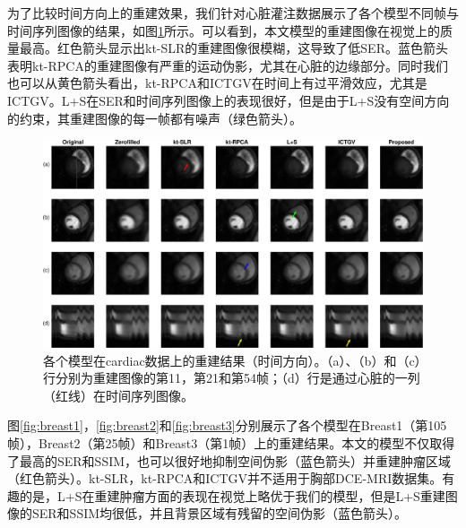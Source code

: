 为了比较时间方向上的重建效果，我们针对心脏灌注数据展示了各个模型不同帧与时间序列图像的结果，如图\ref{fig:perfusion_frames}所示。可以看到，本文模型的重建图像在视觉上的质量最高。红色箭头显示出kt-SLR的重建图像很模糊，这导致了低SER。蓝色箭头表明kt-RPCA的重建图像有严重的运动伪影，尤其在心脏的边缘部分。同时我们也可以从黄色箭头看出，kt-RPCA和ICTGV在时间上有过平滑效应，尤其是ICTGV。L+S在SER和时间序列图像上的表现很好，但是由于L+S没有空间方向的约束，其重建图像的每一帧都有噪声（绿色箭头）。
\begin{figure}
\centering
\includegraphics[width=1\textwidth]{img/tgvnn/figure4_perfusion_frames.eps}
\caption{各个模型在cardiac数据上的重建结果（时间方向）。（a）、（b）和（c）行分别为重建图像的第11，第21和第54帧；（d）行是通过心脏的一列（红线）在时间序列图像。}
\label{fig:perfusion_frames}
\end{figure}

图\ref{fig:breast1}，\ref{fig:breast2}和\ref{fig:breast3}分别展示了各个模型在Breast1（第105帧），Breast2（第25帧）和Breast3（第1帧）上的重建结果。本文的模型不仅取得了最高的SER和SSIM，也可以很好地抑制空间伪影（蓝色箭头）并重建肿瘤区域（红色箭头）。kt-SLR，kt-RPCA和ICTGV并不适用于胸部DCE-MRI数据集。有趣的是，L+S在重建肿瘤方面的表现在视觉上略优于我们的模型，但是L+S重建图像的SER和SSIM均很低，并且背景区域有残留的空间伪影（蓝色箭头）。

